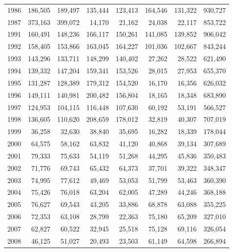 \documentclass[]{article}
\begin{document}
\begin{table}[ht]
\begin{tabular}{crrrrrrr}
1986    &   186,505 &   189,497 &   135,444 &   123,413 &   164,546 &   131,322 &   930,727 \\
1987    &   373,163 &   399,072 &   14,170  &   21,162  &   24,038  &   22,117  &   853,722 \\
1991    &   160,491 &   148,236 &   166,117 &   150,261 &   141,085 &   139,852 &   906,042 \\
1992    &   158,405 &   153,866 &   163,045 &   164,227 &   101,036 &   102,667 &   843,244 \\
1993    &   143,296 &   133,711 &   148,299 &   140,402 &   27,262  &   28,522  &   621,490 \\
1994    &   139,332 &   147,204 &   159,341 &   153,526 &   28,015  &   27,953  &   655,370 \\
1995    &   131,287 &   128,389 &   179,312 &   154,520 &   16,170  &   16,356  &   626,032 \\
1996    &   149,111 &   140,981 &   200,482 &   156,804 &   18,165  &   18,348  &   683,890 \\
1997    &   124,953 &   104,115 &   116,448 &   107,630 &   60,192  &   53,191  &   566,527 \\
1998    &   136,605 &   110,620 &   208,659 &   178,012 &   32,819  &   40,307  &   707,019 \\
1999    &   36,258  &   32,630  &   38,840  &   35,695  &   16,282  &   18,339  &   178,044 \\
2000    &   64,575  &   58,162  &   63,832  &   41,120  &   40,868  &   39,134  &   307,689 \\
2001    &   79,333  &   75,633  &   54,119  &   51,268  &   44,295  &   45,836  &   350,483 \\
2002    &   71,776  &   69,743  &   65,432  &   64,373  &   37,701  &   39,322  &   348,347 \\
2003    &   74,995  &   77,612  &   49,469  &   53,053  &   51,799  &   53,463  &   360,390 \\
2004    &   75,426  &   76,018  &   63,204  &   62,005  &   47,289  &   44,246  &   368,188 \\
2005    &   76,627  &   69,543  &   43,205  &   33,886  &   68,878  &   63,088  &   355,225 \\
2006    &   72,353  &   63,108  &   28,799  &   22,363  &   75,180  &   65,209  &   327,010 \\
2007    &   62,827  &   60,522  &   32,945  &   25,518  &   75,128  &   69,116  &   326,054 \\
2008    &   46,125  &   51,027  &   20,493  &   23,503  &   61,149  &   64,598  &   266,894 \\

\end{tabular}
\end{table}
\end{document}
